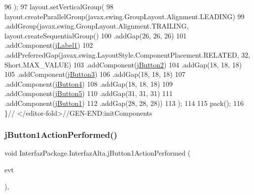 \begin{DoxyCode}
96         );
97         layout.setVerticalGroup(
98             layout.createParallelGroup(javax.swing.GroupLayout.Alignment.LEADING)
99             .addGroup(javax.swing.GroupLayout.Alignment.TRAILING, layout.createSequentialGroup()
100                 .addGap(26, 26, 26)
101                 .addComponent(\mbox{\hyperlink{class_interfaz_package_1_1_interfaz_alta_a353b3664adfc462e1ec4be9e78f5da33}{jLabel1}})
102                 .addPreferredGap(javax.swing.LayoutStyle.ComponentPlacement.RELATED, 32, Short.MAX\_VALUE)
103                 .addComponent(\mbox{\hyperlink{class_interfaz_package_1_1_interfaz_alta_a1657bb8744ea591f1eb9e70c5c570169}{jButton2}})
104                 .addGap(18, 18, 18)
105                 .addComponent(\mbox{\hyperlink{class_interfaz_package_1_1_interfaz_alta_a2bce273c449eda774b687351d594071c}{jButton3}})
106                 .addGap(18, 18, 18)
107                 .addComponent(\mbox{\hyperlink{class_interfaz_package_1_1_interfaz_alta_a1766bf9cf73dcb04fa55a88750a864f5}{jButton4}})
108                 .addGap(18, 18, 18)
109                 .addComponent(\mbox{\hyperlink{class_interfaz_package_1_1_interfaz_alta_a368946c13229a442a7633f37c8fa0425}{jButton5}})
110                 .addGap(31, 31, 31)
111                 .addComponent(\mbox{\hyperlink{class_interfaz_package_1_1_interfaz_alta_a04cc5364c89f6cbda8e46022ea7ddbf4}{jButton1}})
112                 .addGap(28, 28, 28))
113         );
114 
115         pack();
116     \}\textcolor{comment}{// </editor-fold>//GEN-END:initComponents}
\end{DoxyCode}
\mbox{\label{class_interfaz_package_1_1_interfaz_alta_a70858cd5c6c13a2e218388ace83d9041}} 
\subsubsection{\texorpdfstring{j\+Button1\+Action\+Performed()}{jButton1ActionPerformed()}}
{\footnotesize\ttfamily void Interfaz\+Package.\+Interfaz\+Alta.\+j\+Button1\+Action\+Performed (\begin{DoxyParamCaption}\item[{java.\+awt.\+event.\+Action\+Event}]{evt }\end{DoxyParamCaption})\hspace{0.3cm}{\ttfamily [inline]}, {\ttfamily [private]}}


